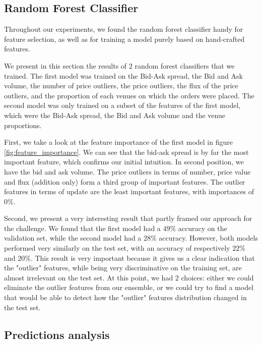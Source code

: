 \documentclass[switch, 11pt]{article}
\begin{document}
\begin{multicols}{2}
    \subsection{Random Forest Classifier}
    Throughout our experiments, we found the random forest classifier handy for feature selection, as well as for training a model purely based on hand-crafted features.

    We present in this section the results of $2$ random forest classifiers that we trained. The first model was trained on the Bid-Ask spread, the Bid and Ask volume, the number of price outliers, the price outliers, the flux of the price outliers, and the proportion of each venues on which the orders were placed. The second model was only trained on a subset of the features of the first model, which were the Bid-Ask spread, the Bid and Ask volume and the venue proportions.

    First, we take a look at the feature importance of the first model in figure \ref{fig:feature_importance}. We can see that the bid-ask spread is by far the most important feature, which confirms our initial intuition. In second position, we have the bid and ask volume. The price outliers in terms of number, price value and flux (addition only) form a third group of important features. The outlier features in terms of update are the least important features, with importances of $0 \%$.

    Second, we present a very interesting result that partly framed our approach for the challenge. We found that the first model had a $49\%$ accuracy on the validation set, while the second model had a $28\%$ accuracy. However, both models performed very similarly on the test set, with an accuracy of respectively $22\%$ and $20\%$. This result is very important because it gives us a clear indication that the "outlier" features, while being very discriminative on the training set, are almost irrelevant on the test set. At this point, we had $2$ choices: either we could eliminate the outlier features from our ensemble, or we could try to find a model that would be able to detect how the "outlier" features distribution changed in the test set.

    \subsection{Predictions analysis}


\end{multicols}
\end{document}
